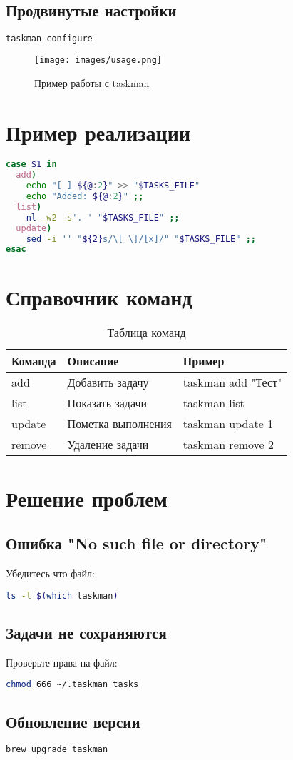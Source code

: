 \documentclass[a4paper,12pt]{article}
\begin{document}
\subsection{Продвинутые настройки}
\begin{lstlisting}[language=bash]
taskman configure
\end{lstlisting}

\begin{figure}[h]
  \centering
  \texttt{[image: images/usage.png]}
  \caption{Пример работы с taskman}
  \label{fig:usage}
  \end{figure}

\section{Пример реализации}
\begin{lstlisting}[language=bash, caption=Фрагмент скрипта taskman]
case $1 in
  add)
    echo "[ ] ${@:2}" >> "$TASKS_FILE"
    echo "Added: ${@:2}" ;;
  list)
    nl -w2 -s'. ' "$TASKS_FILE" ;;
  update)
    sed -i '' "${2}s/\[ \]/[x]/" "$TASKS_FILE" ;;
esac
\end{lstlisting}

\section{Справочник команд}
\begin{table}[h]
\centering
\begin{tabular}{|l|l|l|}
\hline
\textbf{Команда} & \textbf{Описание} & \textbf{Пример} \\
\hline
add & Добавить задачу & taskman add "Тест" \\
list & Показать задачи & taskman list \\
update & Пометка выполнения & taskman update 1 \\
remove & Удаление задачи & taskman remove 2 \\
\hline
\end{tabular}
\caption{Таблица команд}
\end{table}

\section{Решение проблем}
\subsection{Ошибка "No such file or directory"}
Убедитесь что файл:
\begin{lstlisting}[language=bash]
ls -l $(which taskman)
\end{lstlisting}

\subsection{Задачи не сохраняются}
Проверьте права на файл:
\begin{lstlisting}[language=bash]
chmod 666 ~/.taskman_tasks
\end{lstlisting}

\subsection{Обновление версии}
\begin{lstlisting}[language=bash]
brew upgrade taskman
\end{lstlisting}
\end{document}
